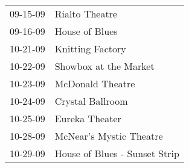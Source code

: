 \begin{supertabular}{p{0.07\textwidth}p{0.23\textwidth}}
 09-15-09 &                 Rialto Theatre \\
 09-16-09 &                 House of Blues \\
 10-21-09 &               Knitting Factory \\
 10-22-09 &          Showbox at the Market \\
 10-23-09 &               McDonald Theatre \\
 10-24-09 &               Crystal Ballroom \\
 10-25-09 &                 Eureka Theater \\
 10-28-09 &        McNear's Mystic Theatre \\
 10-29-09 &  House of Blues - Sunset Strip \\
\end{supertabular}
